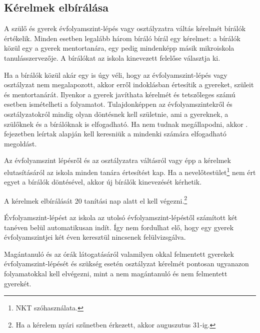 
\subsection{Kérelmek elbírálása}

A szülő és gyerek évfolyamszint-lépés vagy osztályzatra váltás kérelmét bírálók
értékelik. Minden esetben legalább három bíráló bírál egy kérelmet: a
bírálók közül egy a gyerek mentortanára, egy pedig mindenképp másik mikroiskola
tanulásszervezője. A bírálókat az iskola kinevezett felelőse választja ki.

Ha a bírálók közül akár egy is úgy véli, hogy az évfolyamszint-lépés vagy
osztályzat nem megalapozott, akkor
erről indoklásban értesítik a gyereket, szüleit és mentortanárát. Ilyenkor a
gyerek javíthata kérelmét és tetszőleges számú esetben ismételheti a
folyamatot. Tulajdonképpen az évfolyamszintekről és osztályzatokról mindig
olyan döntésnek kell születnie, ami a gyereknek, a szülőknek és a bírálóknak is
elfogadható. Ha nem tudnak megállapodni, akkor
. fejezetben leírtak alapján kell keresniük a
mindenki számára elfogadható megoldást.

Az évfolyamszint lépésről és az osztályzatra váltásról vagy épp a kérelmek
elutasításáról az iskola minden tanára értesítést kap. Ha a
nevelőtestület\footnote{NKT szóhasználata.}
nem ért egyet a bírálók döntésével, akkor új bírálók kinevezését kérhetik.

A kérelmek elbírálását 20 tanítási nap alatt el kell végezni.\footnote{Ha a
    kérelem nyári szűnetben érkezett, akkor auguszutus 31-ig.}

Évfolyamszint-lépést az iskola az utolsó évfolyamszint-lépéstől számított két
tanéven belül automatikusan indít. Így nem fordulhat elő, hogy egy gyerek
évfolyamszintjei két éven keresztül nincsenek felülvizsgálva.

Magántanuló és az órák látogatásáról valamilyen okkal felmentett gyerekek
évfolyamszint-lépését és szükség esetén osztályzat kérelmét pontosan ugyanazon
folyamatokkal kell elvégezni, mint a nem magántanuló és nem felmentett
gyerekét.

